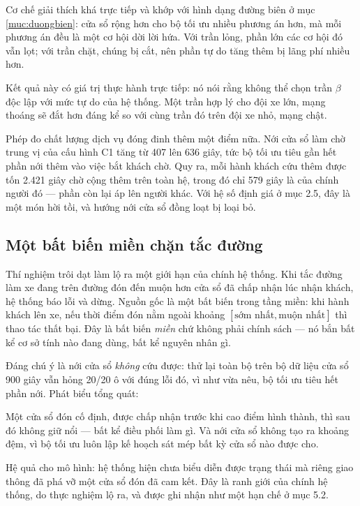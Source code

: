 Cơ chế giải thích khá trực tiếp và khớp với hình dạng đường biên ở mục \ref{muc:duongbien}: cửa sổ rộng hơn cho bộ tối ưu nhiều
phương án hơn, mà mỗi phương án đều là một cơ hội dời lời hứa. Với trần lỏng, phần lớn các cơ
hội đó vẫn lọt; với trần chặt, chúng bị cắt, nên phần tự do tăng thêm bị lãng phí nhiều hơn.

Kết quả này có giá trị thực hành trực tiếp: nó nói rằng không thể chọn trần $\beta$ độc lập với
mức tự do của hệ thống. Một trần hợp lý cho đội xe lớn, mạng thoáng sẽ đắt hơn đáng kể so với
cùng trần đó trên đội xe nhỏ, mạng chật.

Phép đo chất lượng dịch vụ đóng đinh thêm một điểm nữa. Nới cửa sổ làm chờ trung vị của cấu
hình C1 tăng từ 407 lên 636 giây, tức bộ tối ưu tiêu gần hết phần nới thêm vào việc bắt khách
chờ. Quy ra, mỗi hành khách cứu thêm được tốn 2.421 giây chờ cộng thêm trên toàn hệ, trong đó
chỉ 579 giây là của chính người đó --- phần còn lại áp lên người khác. Với hệ số định giá ở mục
2.5, đây là một món hời tồi, và hướng nới cửa sổ đồng loạt bị loại bỏ.

\subsection{Một bất biến miền chặn tắc đường}
\label{muc:batbien}

Thí nghiệm trôi dạt làm lộ ra một giới hạn của chính hệ thống. Khi tắc đường làm xe đang trên
đường đón đến muộn hơn cửa sổ đã chấp nhận lúc nhận khách, hệ thống báo lỗi và dừng. Nguồn gốc
là một bất biến trong tầng miền: khi hành khách lên xe, nếu thời điểm đón nằm ngoài khoảng
$[\text{sớm nhất}, \text{muộn nhất}]$ thì thao tác thất bại. Đây là bất biến \emph{miền} chứ
không phải chính sách --- nó bắn bất kể cơ sở tính nào đang dùng, bất kể nguyên nhân gì.

Đáng chú ý là nới cửa sổ \emph{không} cứu được: thử lại toàn bộ trên bộ dữ liệu cửa sổ 900 giây
vẫn hỏng 20/20 ô với đúng lỗi đó, vì như vừa nêu, bộ tối ưu tiêu hết phần nới. Phát biểu tổng
quát:

\begin{khungy}
Một cửa sổ đón cố định, được chấp nhận trước khi cao điểm hình thành, thì sau đó không giữ nổi
--- bất kể điều phối làm gì. Và nới cửa sổ không tạo ra khoảng đệm, vì bộ tối ưu luôn lập kế
hoạch sát mép bất kỳ cửa sổ nào được cho.
\end{khungy}

Hệ quả cho mô hình: hệ thống hiện chưa biểu diễn được trạng thái mà riêng giao thông đã phá vỡ
một cửa sổ đón đã cam kết. Đây là ranh giới của chính hệ thống, do thực nghiệm lộ ra, và được
ghi nhận như một hạn chế ở mục 5.2.

